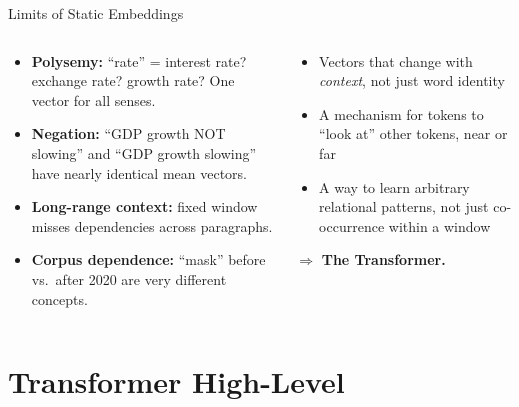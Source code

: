 \documentclass[10pt,english,aspectratio=169]{beamer}
\begin{document}
\begin{frame}{Limits of Static Embeddings}
\begin{columns}[T]
\begin{tcolorbox}[colback=red!5, colframe=red!50!black, title=\textbf{What static embeddings miss}]
\begin{itemize}
\item \textbf{Polysemy:} ``rate'' = interest rate? exchange rate? growth rate? One vector for all senses.
\item \textbf{Negation:} ``GDP growth NOT slowing'' and ``GDP growth slowing'' have nearly identical mean vectors.
\item \textbf{Long-range context:} fixed window misses dependencies across paragraphs.
\item \textbf{Corpus dependence:} ``mask'' before vs.\ after 2020 are very different concepts.
\end{itemize}
\end{tcolorbox}

\begin{tcolorbox}[colback=green!5, colframe=green!40!black, title=\textbf{What we need next}]
\begin{itemize}
\item Vectors that change with \emph{context}, not just word identity
\item A mechanism for tokens to ``look at'' other tokens, near or far
\item A way to learn arbitrary relational patterns, not just co-occurrence within a window
\end{itemize}
\medskip
$\Longrightarrow$ \textbf{The Transformer.}
\end{tcolorbox}
\end{columns}
\end{frame}

\section{Transformer High-Level}
\end{document}
